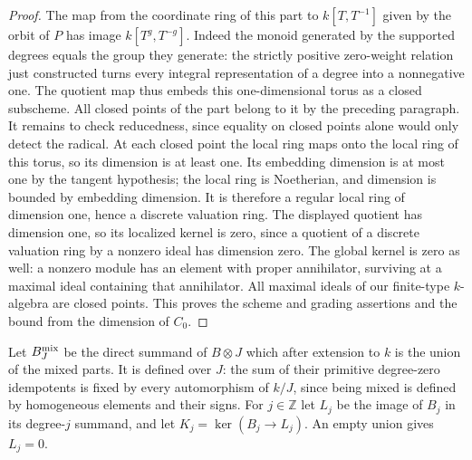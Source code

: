 \documentclass[a4paper,11pt]{article}
\theoremstyle{definition}
\theoremstyle{remark}
\newcommand{\ZZ}{\mathbb Z}\newcommand{\ord}{\operatorname{ord}}
\numberwithin{equation}{section}
\begin{document}
\begin{proof}
The map from the coordinate ring of this part to \(k[T,T^{-1}]\) given by the orbit of \(P\) has image \(k[T^g,T^{-g}]\). Indeed the monoid generated by the supported degrees equals the group they generate: the strictly positive zero-weight relation just constructed turns every integral representation of a degree into a nonnegative one. The quotient map thus embeds this one-dimensional torus as a closed subscheme. All closed points of the part belong to it by the preceding paragraph. It remains to check reducedness, since equality on closed points alone would only detect the radical. At each closed point the local ring maps onto the local ring of this torus, so its dimension is at least one. Its embedding dimension is at most one by the tangent hypothesis; the local ring is Noetherian, and dimension is bounded by embedding dimension. It is therefore a regular local ring of dimension one, hence a discrete valuation ring. The displayed quotient has dimension one, so its localized kernel is zero, since a quotient of a discrete valuation ring by a nonzero ideal has dimension zero. The global kernel is zero as well: a nonzero module has an element with proper annihilator, surviving at a maximal ideal containing that annihilator. All maximal ideals of our finite-type \(k\)-algebra are closed points. This proves the scheme and grading assertions and the bound from the dimension of \(C_0\).
\end{proof}

Let \(B^{\rm mix}_J\) be the direct summand of \(B\otimes J\) which after extension to \(k\) is the union of the mixed parts. It is defined over \(J\): the sum of their primitive degree-zero idempotents is fixed by every automorphism of \(k/J\), since being mixed is defined by homogeneous elements and their signs. For \(j\in\ZZ\) let \(L_j\) be the image of \(B_j\) in its degree-\(j\) summand, and let \(K_j=\ker(B_j\to L_j)\). An empty union gives \(L_j=0\).
\end{document}
